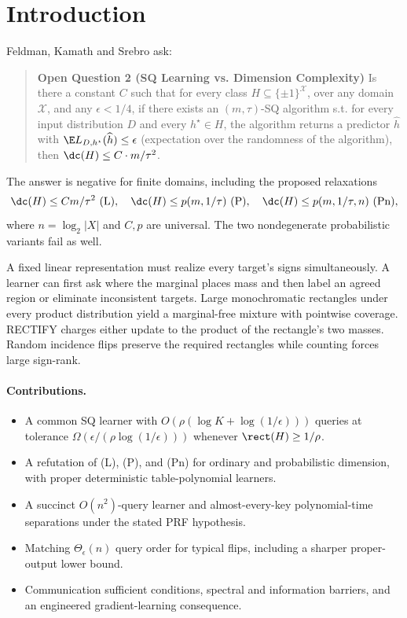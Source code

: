 \section{Introduction}\label{sec:introduction}
Feldman, Kamath and Srebro \citep[Open Question~2]{FKS26} ask:
\begin{quote}\small
\textbf{Open Question 2 (SQ Learning vs. Dimension Complexity)} Is there a constant $C$ such that for every class $H\subseteq\{\pm1\}^{\mathcal X}$, over any domain $\mathcal X$, and any $\epsilon<1/4$, if there exists an $(m,\tau)$-SQ algorithm s.t. for every input distribution $D$ and every $h^\star\in H$, the algorithm returns a predictor $\widehat h$ with $\E L_{D,h^\star}(\widehat h)\le\epsilon$ (expectation over the randomness of the algorithm), then $\dc(H)\le C\cdot m/\tau^2$.
\end{quote}
The answer is negative for finite domains, including the proposed relaxations
\begin{equation}\label{eq:forms}
 \dc(H)\le Cm/\tau^2\ \text{(L)},\quad
 \dc(H)\le p(m,1/\tau)\ \text{(P)},\quad
 \dc(H)\le p(m,1/\tau,n)\ \text{(Pn)},
\end{equation}
where $n=\log_2|X|$ and $C,p$ are universal. The two nondegenerate probabilistic variants fail as well.

A fixed linear representation must realize every target's signs simultaneously. A learner can first ask where the marginal places mass and then label an agreed region or eliminate inconsistent targets. Large monochromatic rectangles under every product distribution yield a marginal-free mixture with pointwise coverage. RECTIFY charges either update to the product of the rectangle's two masses. Random incidence flips preserve the required rectangles while counting forces large sign-rank.

\paragraph{Contributions.}
\begin{itemize}
\item A common SQ learner with $O(\rho(\log K+\log(1/\epsilon)))$ queries at tolerance $\Omega(\epsilon/(\rho\log(1/\epsilon)))$ whenever $\rect(H)\ge1/\rho$.
\item A refutation of (L), (P), and (Pn) for ordinary and probabilistic dimension, with proper deterministic table-polynomial learners.
\item A succinct $O(n^2)$-query learner and almost-every-key polynomial-time separations under the stated PRF hypothesis.
\item Matching $\Theta_\epsilon(n)$ query order for typical flips, including a sharper proper-output lower bound.
\item Communication sufficient conditions, spectral and information barriers, and an engineered gradient-learning consequence.
\end{itemize}

